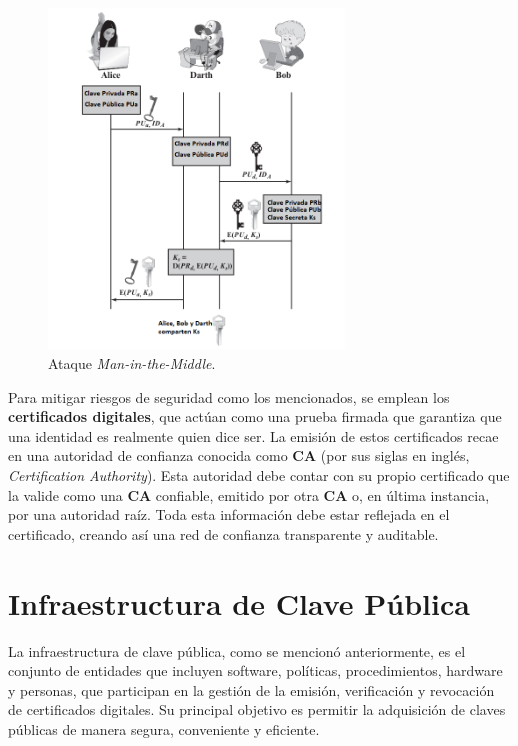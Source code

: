 \begin{figure}[!htbp]
    \centering
    \includegraphics[width=0.7\textwidth]{./Graphics/MIM.png}
    \caption{\scriptsize Ataque \textit{Man-in-the-Middle}.}
    \label{fig:MIM}
\end{figure}

Para mitigar riesgos de seguridad como los mencionados, se emplean los \textbf{certificados digitales}, que actúan como una prueba firmada que garantiza que una identidad es realmente quien dice ser. 
La emisión de estos certificados recae en una autoridad de confianza conocida como \textbf{CA} (por sus siglas en inglés, \textit{Certification Authority}). 
Esta autoridad debe contar con su propio certificado que la valide como una \textbf{CA} confiable, emitido por otra \textbf{CA} o, en última instancia, por una autoridad raíz. 
Toda esta información debe estar reflejada en el certificado, creando así una red de confianza transparente y auditable.

\section{Infraestructura de Clave Pública}

La infraestructura de clave pública, como se mencionó anteriormente, es el conjunto de entidades que incluyen software, políticas, procedimientos, hardware y personas, que participan en la gestión de la emisión, verificación y revocación de certificados digitales. Su principal objetivo es permitir la adquisición de claves públicas de manera segura, conveniente y eficiente.

